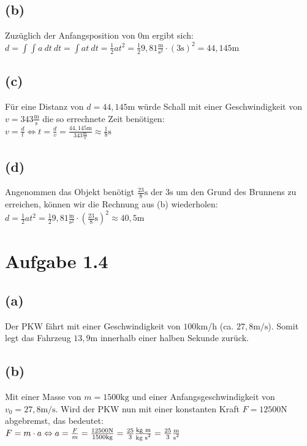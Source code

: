 \documentclass[]{article}
\newcommand{\eq}{\Leftrightarrow}
\newcommand{\unit}[1]{\text{#1}}
\newcommand{\fracunit}[2]{\frac{\unit{#1}}{\unit{#2}}}
\newcommand{\textsq}[1]{\ensuremath{\text{#1}^2}}
\begin{document}
\subsection*{(b)}
	Zuzüglich der Anfangsposition von $0\unit{m}$ ergibt sich:\\
	$ d = \int\int a~dt~dt = \int at~dt = \frac{1}{2}at^2 = \frac{1}{2}9,81\frac{\unit{m}}{\text{s}^2} \cdot (3\unit{s})^2 = 44,145\unit{m}$
\subsection*{(c)}
	Für eine Distanz von $d=44,145\unit{m}$ würde Schall mit einer Geschwindigkeit von $v = 343\fracunit{m}{s}$ die so errechnete Zeit benötigen:\\
	$v = \frac{d}{t} \eq t = \frac{d}{v} = \frac{44,145\unit{m}}{343\fracunit{m}{s}} \approx \frac{1}{8}\unit{s}$
\subsection*{(d)}
	Angenommen das Objekt benötigt $\fracunit{23}{8}\unit{s}$ der $3\unit{s}$ um den Grund des Brunnens zu erreichen, können wir die Rechnung aus (b) wiederholen:\\
	$ d = \frac{1}{2}at^2 = \frac{1}{2}9,81\frac{\unit{m}}{\text{s}^2} \cdot (\fracunit{23}{8}\unit{s})^2 \approx 40,5\unit{m}$

\section*{Aufgabe 1.4}
\par
\subsection*{(a)}
	Der PKW fährt mit einer Geschwindigkeit von $100$km/h (ca. $27,8\unit{m/s}$). Somit legt das Fahrzeug $13,9\unit{m}$ innerhalb einer halben Sekunde zurück.
\subsection*{(b)}
	Mit einer Masse von $m = 1500\unit{kg}$ und einer Anfangsgeschwindigkeit von $v_0 = 27,8\unit{m/s}$. Wird der PKW nun mit einer konstanten Kraft $F = 12500\unit{N}$ abgebremst, das bedeutet:\\
	$F = m \cdot a \eq a = \frac{F}{m} = \frac{12500\unit{N}}{1500\unit{kg}} = \frac{25}{3}\fracunit{kg~m}{kg~\textsq{s}} = \frac{25}{3} \fracunit{m}{\textsq{s}}$
\end{document}
